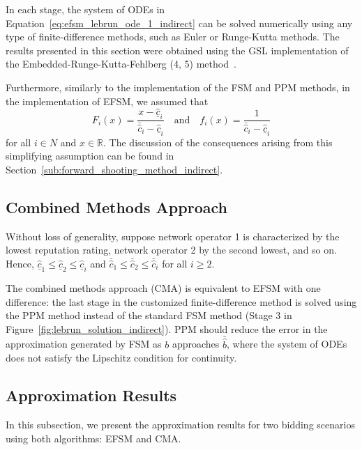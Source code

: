 In each stage, the system of ODEs in Equation~\eqref{eq:efsm_lebrun_ode_1_indirect} can be solved numerically using any type of finite-difference methods, such as Euler or Runge-Kutta methods. The results presented in this section were obtained using the GSL implementation of the Embedded-Runge-Kutta-Fehlberg (4, 5) method~\cite{GSL}.

Furthermore, similarly to the implementation of the FSM and PPM methods, in the implementation of EFSM, we assumed that
\begin{equation*}
  F_i(x) = \frac{x - \underline{\hat{c}}_i}{\bar{\hat{c}}_i - \underline{\hat{c}}_i} \quad\text{and}\quad f_i(x) = \frac{1}{\bar{\hat{c}}_i - \underline{\hat{c}}_i}
\end{equation*}
for all $i\in N$ and $x\in\mathbb{R}$. The discussion of the consequences arising from this simplifying assumption can be found in Section~\ref{sub:forward_shooting_method_indirect}.


\subsection{Combined Methods Approach} %
\label{sub:combined_methods_approach_indirect}
Without loss of generality, suppose network operator 1 is characterized by the lowest reputation rating, network operator 2 by the second lowest, and so on. Hence, $\underline{\hat{c}}_1\leq \underline{\hat{c}}_2\leq \underline{\hat{c}}_i$ and $\bar{\hat{c}}_1\leq \bar{\hat{c}}_2\leq \bar{\hat{c}}_i$ for all $i\geq 2$.

The combined methods approach (CMA) is equivalent to EFSM with one difference: the last stage in the customized finite-difference method is solved using the PPM method instead of the standard FSM method (Stage 3 in Figure~\ref{fig:lebrun_solution_indirect}). PPM should reduce the error in the approximation generated by FSM as $b$ approaches $\bar{\hat{b}}$, where the system of ODEs does not satisfy the Lipschitz condition for continuity.

\subsection{Approximation Results} %
\label{sub:extended_approximation_results_indirect}
In this subsection, we present the approximation results for two bidding scenarios using both algorithms: EFSM and CMA.


